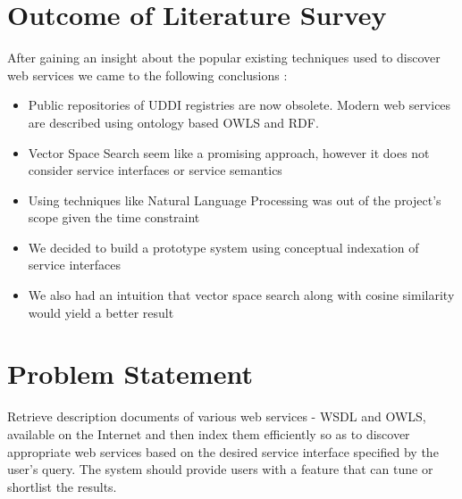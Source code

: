 \documentclass[12pt, oneside]{book}
\begin{document}
\section{Outcome of Literature Survey}
After gaining an insight about the popular existing techniques used to discover web services we came to the following conclusions :
\begin{itemize}
 \item Public repositories of UDDI registries are now obsolete. Modern web services are described using ontology based OWLS and RDF.
 \item Vector Space Search seem like a promising approach, however it does not consider service interfaces or service semantics
 \item Using techniques like Natural Language Processing was out of the project's scope given the time constraint
 \item We decided to build a prototype system using conceptual indexation of service interfaces
 \item We also had an intuition that vector space search along with cosine similarity would yield a better result
\end{itemize}

\section{Problem Statement}
Retrieve description documents of various web services - WSDL and OWLS, available on the Internet and then index them efficiently so as to discover appropriate web services based on the desired service interface specified by the user's query. The system should provide users with a feature that can tune or shortlist the results.
\end{document}
